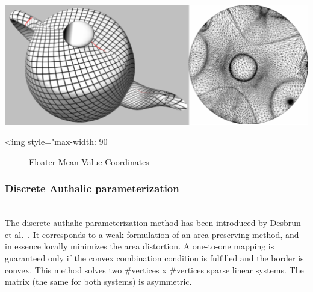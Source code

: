 \begin{center}
    \label{Surface_mesh_parameterization-fig-floater}
    \begin{ccTexOnly}
      \includegraphics[width=1.0\textwidth]{Surface_mesh_parameterization/floater}
    \end{ccTexOnly}
    \begin{ccHtmlOnly}
        <img style="max-width: 90%
    \end{ccHtmlOnly}
    \begin{figure}[ht]
        \caption{Floater Mean Value Coordinates}
    \end{figure}
\end{center}

\subsubsection{Discrete Authalic parameterization}

  \\

The discrete authalic parameterization method has been introduced by
Desbrun et al.~\cite{cgal:dma-ipsm-02}. It corresponds to
a weak formulation of an area-preserving method, and in essence
locally minimizes the area distortion. A one-to-one mapping is
guaranteed only if the convex combination condition is fulfilled and
the border is convex. This method solves two
\#vertices x \#vertices sparse linear systems. The matrix (the same
for both systems) is asymmetric.

